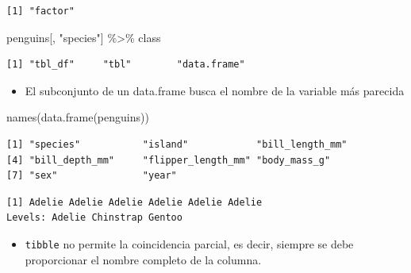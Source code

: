 \documentclass[
  letterpaper,
  DIV=11,
  numbers=noendperiod]{scrreprt}
\newenvironment{Shaded}{\begin{snugshade}}{\end{snugshade}}
\newcommand{\FunctionTok}[1]{\textcolor[rgb]{0.28,0.35,0.67}{#1}}
\newcommand{\NormalTok}[1]{\textcolor[rgb]{0.00,0.23,0.31}{#1}}
\newcommand{\SpecialCharTok}[1]{\textcolor[rgb]{0.37,0.37,0.37}{#1}}
\newcommand{\StringTok}[1]{\textcolor[rgb]{0.13,0.47,0.30}{#1}}
\providecommand{\tightlist}{%
  \setlength{\itemsep}{0pt}\setlength{\parskip}{0pt}}\usepackage{longtable,booktabs,array}
\begin{document}
\begin{verbatim}
[1] "factor"
\end{verbatim}

\begin{Shaded}
\begin{Highlighting}[]
\NormalTok{penguins[, }\StringTok{"species"}\NormalTok{] }\SpecialCharTok{\%\textgreater{}\%}\NormalTok{ class}
\end{Highlighting}
\end{Shaded}

\begin{verbatim}
[1] "tbl_df"     "tbl"        "data.frame"
\end{verbatim}

\begin{itemize}
\tightlist
\item
  El subconjunto de un data.frame busca el nombre de la variable más
  parecida
\end{itemize}

\begin{Shaded}
\begin{Highlighting}[]
\FunctionTok{names}\NormalTok{(}\FunctionTok{data.frame}\NormalTok{(penguins))}
\end{Highlighting}
\end{Shaded}

\begin{verbatim}
[1] "species"           "island"            "bill_length_mm"   
[4] "bill_depth_mm"     "flipper_length_mm" "body_mass_g"      
[7] "sex"               "year"             
\end{verbatim}

\begin{Shaded}
\end{Shaded}

\begin{verbatim}
[1] Adelie Adelie Adelie Adelie Adelie Adelie
Levels: Adelie Chinstrap Gentoo
\end{verbatim}

\begin{itemize}
\tightlist
\item
  \texttt{tibble} no permite la coincidencia parcial, es decir, siempre
  se debe proporcionar el nombre completo de la columna.
\end{itemize}
\end{document}
